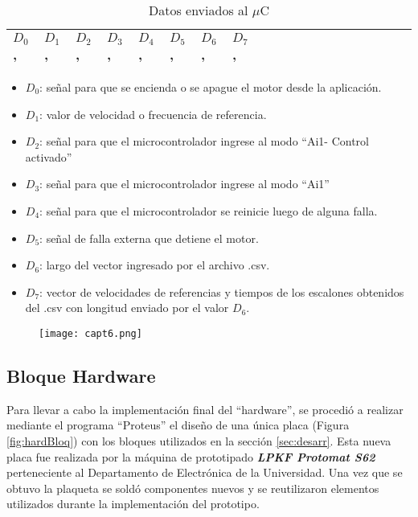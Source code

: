 \begin{enumerate}
\begin{table}[H]
	\centering
	\begin{tabular}{|l|l|l|l|l|l|l|l|l|l|l|l|l|l|l|l|l|l|l|l|}
		\hline
			$D_0$ , & $D_1$ , & $D_2$ , & $D_3$ , & $D_4$ , & $D_5$ , & $D_6$ ,  & $D_7$ , \\ \hline
	\end{tabular}
\caption{Datos enviados al $\mu$C}
\label{tab:Datosenviados}
\end{table}

\begin{itemize}
\item $D_0$: señal para que se encienda o se apague el motor desde la aplicación.
\item $D_1$: valor de velocidad o frecuencia de referencia.
\item $D_2$: señal para que el microcontrolador ingrese al modo “Ai1- Control activado”
\item $D_3$: señal para que el microcontrolador ingrese al modo “Ai1”
\item $D_4$: señal para que el microcontrolador se reinicie luego de alguna falla.
\item $D_5$: señal de falla externa que detiene el motor.
\item $D_6$: largo del vector ingresado por el archivo .csv.
\item $D_7$: vector de velocidades de referencias y tiempos de los escalones obtenidos del .csv con longitud enviado por el valor $D_6$.
\end{itemize}	

\end{enumerate}
\begin{figure}[H]
	\centering
	\texttt{[image: capt6.png]}
	\label{fig:capt6}
\end{figure}

\subsection{Bloque Hardware} \label{sec:hard}

Para llevar a cabo la implementación final del “hardware”, se procedió a realizar mediante el programa “Proteus” el diseño de una única placa (Figura \ref{fig:hardBloq}) con los bloques utilizados en la sección \ref{sec:desarr}. Esta nueva placa fue realizada por la máquina de prototipado \textbf{\textit{LPKF Protomat S62}} perteneciente al Departamento de Electrónica de la Universidad. Una vez que se obtuvo la plaqueta se soldó componentes nuevos y se reutilizaron elementos utilizados durante la implementación del prototipo.  

